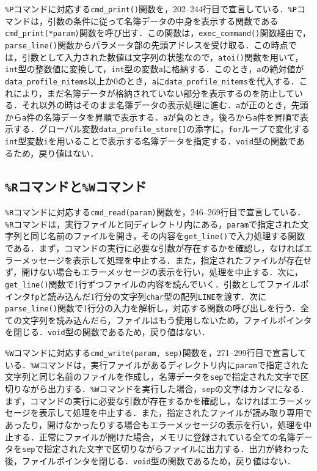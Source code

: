 \verb|%P|コマンドに対応する\verb|cmd_print()|関数を，202--244行目で宣言している．\verb|%P|コマンドは，引数の条件に従って名簿データの中身を表示する関数である\verb|cmd_print(*param)|関数を呼び出す．この関数は，\verb|exec_command()|関数経由で，\verb|parse_line()|関数からパラメータ部の先頭アドレスを受け取る．この時点では，引数として入力された数値は文字列の状態なので，\verb|atoi()|関数を用いて，\verb|int|型の整数値に変換して，\verb|int|型の変数\verb|a|に格納する．このとき，\verb|a|の絶対値が\verb|data_profile_nitems|以上か$0$のとき，\verb|a|に\verb|data_profile_nitems|を代入する．これにより，まだ名簿データが格納されていない部分を表示するのを防止している．それ以外の時はそのまま名簿データの表示処理に進む．\verb|a|が正のとき，先頭から\verb|a|件の名簿データを昇順で表示する．\verb|a|が負のとき，後ろから\verb|a|件を昇順で表示する．グローバル変数\verb|data_profile_store[]|の添字に，\verb|for|ループで変化する\verb|int|型変数\verb|i|を用いることで表示する名簿データを指定する．\verb|void|型の関数であるため，戻り値はない．

\subsection{\texttt{\%R}コマンドと\texttt{\%W}コマンド}

\verb|%R|コマンドに対応する\verb|cmd_read(param)|関数を，246--269行目で宣言している．\verb|%R|コマンドは，実行ファイルと同ディレクトリ内にある，\verb|param|で指定された文字列と同じ名前のファイルを開き，その内容を\verb|get_line()|で入力処理する関数である．まず，コマンドの実行に必要な引数が存在するかを確認し，なければエラーメッセージを表示して処理を中止する．また，指定されたファイルが存在せず，開けない場合もエラーメッセージの表示を行い，処理を中止する．次に，\verb|get_line()|関数で1行ずつファイルの内容を読んでいく．引数としてファイルポインタ\verb|fp|と読み込んだ1行分の文字列\verb|char|型の配列\verb|LINE|を渡す．次に\verb|parse_line()|関数で1行分の入力を解析し，対応する関数の呼び出しを行う．全ての文字列を読み込んだら，ファイルはもう使用しないため，ファイルポインタを閉じる．\verb|void|型の関数であるため，戻り値はない．

\verb|%W|コマンドに対応する\verb|cmd_write(param, sep)|関数を，271--299行目で宣言している．\verb|%W|コマンドは，実行ファイルがあるディレクトリ内に\verb|param|で指定された文字列と同じ名前のファイルを作成し，名簿データを\verb|sep|で指定された文字で区切りながら出力する．\verb|%W|コマンドを実行した場合，\verb|sep|の文字はカンマになる．まず，コマンドの実行に必要な引数が存在するかを確認し，なければエラーメッセージを表示して処理を中止する．また，指定されたファイルが読み取り専用であったり，開けなかったりする場合もエラーメッセージの表示を行い，処理を中止する．正常にファイルが開けた場合，メモリに登録されている全ての名簿データを\verb|sep|で指定された文字で区切りながらファイルに出力する．出力が終わった後，ファイルポインタを閉じる．\verb|void|型の関数であるため，戻り値はない．

